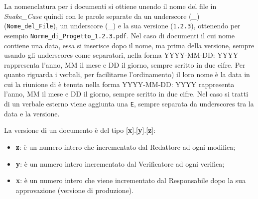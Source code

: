 La nomenclatura per i documenti si ottiene unendo il nome del file in \textit{Snake\_Case} quindi con le parole separate da  un underscore (\textit{\_}) (\texttt{Nome\_del\_File}), un underscore (\textit{\_}) e la sua versione (\texttt{1.2.3}), ottenendo per esempio \texttt{Norme\_di\allowbreak{}\_Progetto\_1.2.3.pdf}. Nel caso di documenti il cui nome contiene una data, essa si inserisce dopo il nome, ma prima della versione, sempre usando gli underscores come separatori, nella forma YYYY-MM-DD: YYYY rappresenta l'anno, MM il mese e DD il giorno, sempre scritto in due cifre.
Per quanto riguarda i  verbali, per facilitarne l'ordinamento) il loro nome è la data in cui la riunione di è tenuta nella forma YYYY-MM-DD: YYYY rappresenta l'anno, MM il mese e DD il giorno, sempre scritto in due cifre. Nel caso si tratti di un verbale esterno viene aggiunta una \texttt{E}, sempre separata da underscores tra la data e la versione.


La versione di un documento è del tipo [\textbf{x}].[\textbf{y}].[\textbf{z}]:
\begin{itemize}
    \item \textbf{z}: è un numero intero che incrementato dal Redattore ad ogni modifica;
    \item \textbf{y}: è un numero intero incrementato dal Verificatore ad ogni verifica;
    \item \textbf{x}: è un numero intero che viene incrementato dal Responsabile dopo la sua approvazione (versione di produzione).
\end{itemize}

